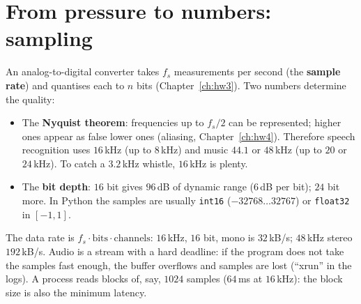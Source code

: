 \section*{From pressure to numbers: sampling}
An analog-to-digital converter takes $f_s$ measurements per second (the \textbf{sample rate}) and quantises each to $n$ bits (Chapter~\ref{ch:hw3}). Two numbers determine the quality:
\begin{itemize}[nosep]
  \item The \textbf{Nyquist theorem}: frequencies up to $f_s/2$ can be represented; higher ones appear as false lower ones (aliasing, Chapter~\ref{ch:hw4}). Therefore speech recognition uses $16$\,kHz (up to $8$\,kHz) and music $44.1$ or $48$\,kHz (up to $20$ or $24$\,kHz). To catch a $3.2$\,kHz whistle, $16$\,kHz is plenty.
  \item The \textbf{bit depth}: $16$ bit gives $96$\,dB of dynamic range ($6$\,dB per bit); $24$ bit more. In Python the samples are usually \texttt{int16} ($-32768\dots32767$) or \texttt{float32} in $[-1,1]$.
\end{itemize}
The data rate is $f_s\cdot\text{bits}\cdot\text{channels}$: $16$\,kHz, $16$ bit, mono is $32$\,kB/s; $48$\,kHz stereo $192$\,kB/s. Audio is a stream with a hard deadline: if the program does not take the samples fast enough, the buffer overflows and samples are lost (``xrun'' in the logs). A process reads blocks of, say, $1024$ samples ($64$\,ms at $16$\,kHz): the block size is also the minimum latency.

